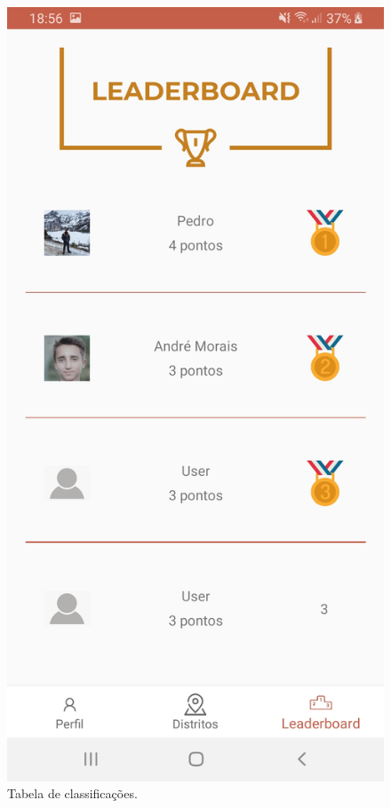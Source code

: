 \begin{figure}[H]
\centering
\includegraphics[width=0.5\linewidth]{images/leaderboard.jpg}
\caption{Tabela de classificações.}
\end{figure}